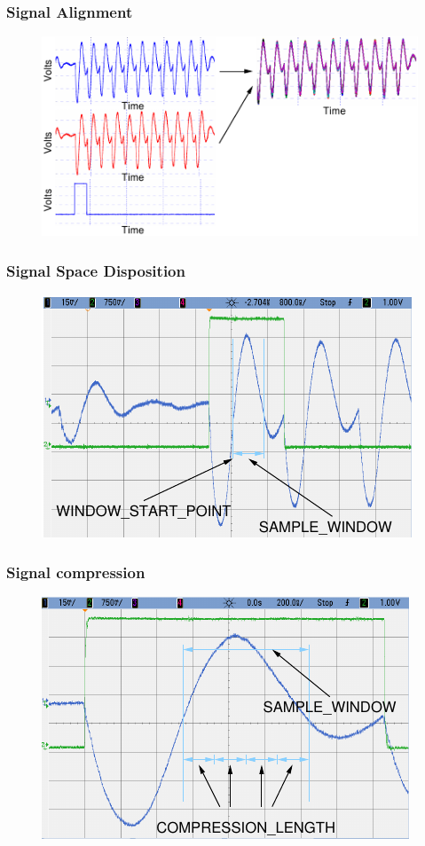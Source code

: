 \subsubsection{Signal Alignment}
\begin{figure}
 \centering
 \includegraphics[scale=2.0]{../figures/tracealingment} 
\end{figure}


\subsubsection{Signal Space Disposition}
\begin{figure}
	\centering
	\includegraphics[scale=1.0]{../figures/oscilloscope-sample-window}
\end{figure}

\subsubsection{Signal compression}
\begin{figure}
	\centering
	\includegraphics[scale=1.0]{../figures/oscilloscope-compression-window}
\end{figure}
